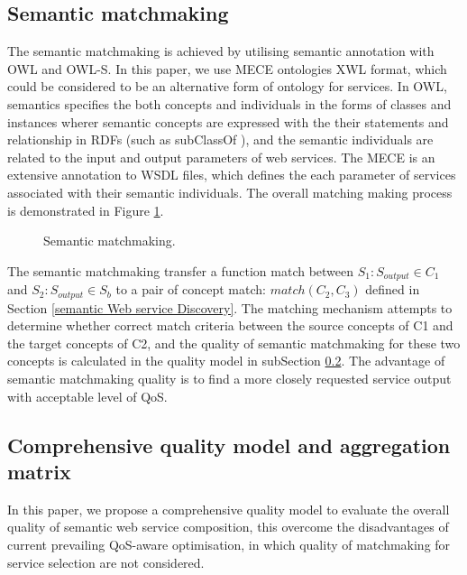 \documentclass{llncs}
\begin{document}
\subsection{Semantic matchmaking}
The semantic matchmaking is achieved by utilising semantic annotation with OWL and OWL-S. In this paper, we use MECE ontologies \cite{bleul2008self} XWL format, which could be considered to be an alternative form of ontology for services. In OWL, semantics specifies the both concepts and individuals in the forms of classes and instances wherer semantic concepts are expressed with the their statements and relationship in RDFs (such as subClassOf ), and the semantic individuals are related to the input and output parameters of web services. The MECE is an extensive annotation to WSDL files, which defines the each parameter of services associated with their semantic individuals. The overall matching making process is demonstrated in Figure \ref{matchmaking}.

\begin{figure}[h]
\centerline{
}
 \caption{Semantic matchmaking.}
 \label{matchmaking}
\end{figure}

The semantic matchmaking transfer a function match between $S_{1}: S_{output} \in C_{1}$ and $S_{2}:S_{output} \in S_{b}$ to a pair of concept match: $match(C_{2}, C_{3})$ defined in Section \ref{semantic Web service Discovery}. The matching mechanism attempts to determine whether correct match criteria between the source concepts of C1 and the target concepts of C2, and the quality of semantic matchmaking for these two concepts is calculated in the quality model in subSection \ref{qualityModel}. The advantage of semantic matchmaking quality is to find a more closely requested service output with acceptable level of QoS.

\subsection{Comprehensive quality model and aggregation matrix}\label{qualityModel}
In this paper, we propose a comprehensive quality model to evaluate the overall quality of semantic web service composition, this overcome the disadvantages of current prevailing QoS-aware optimisation, in which quality of matchmaking for service selection are not considered.
\end{document}
